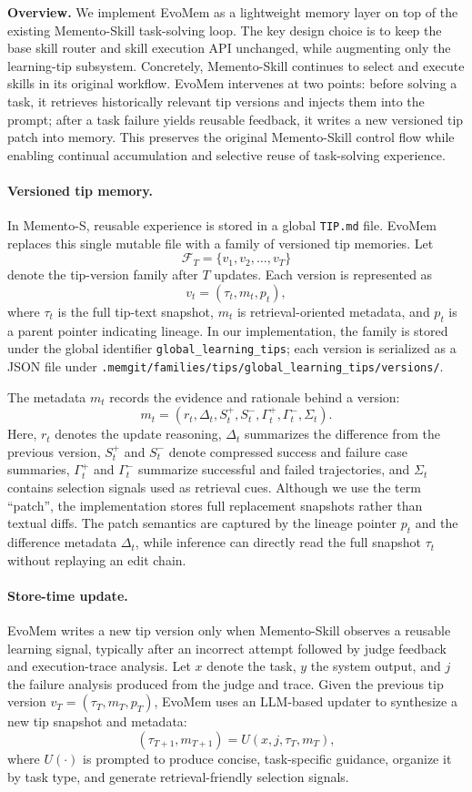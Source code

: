 \documentclass{article}
\begin{document}
\textbf{Overview.}
We implement EvoMem as a lightweight memory layer on top of the existing Memento-Skill task-solving loop. The key design choice is to keep the base skill router and skill execution API unchanged, while augmenting only the learning-tip subsystem. Concretely, Memento-Skill continues to select and execute skills in its original workflow. EvoMem intervenes at two points: before solving a task, it retrieves historically relevant tip versions and injects them into the prompt; after a task failure yields reusable feedback, it writes a new versioned tip patch into memory. This preserves the original Memento-Skill control flow while enabling continual accumulation and selective reuse of task-solving experience.

\paragraph{Versioned tip memory.}
In Memento-S, reusable experience is stored in a global \texttt{TIP.md} file. EvoMem replaces this single mutable file with a family of versioned tip memories. Let
\[
\mathcal{F}_T=\{v_1,v_2,\ldots,v_T\}
\]
denote the tip-version family after $T$ updates. Each version is represented as
\[
v_t=(\tau_t,m_t,p_t),
\]
where $\tau_t$ is the full tip-text snapshot, $m_t$ is retrieval-oriented metadata, and $p_t$ is a parent pointer indicating lineage. In our implementation, the family is stored under the global identifier \texttt{global\_learning\_tips}; each version is serialized as a JSON file under \texttt{.memgit/families/tips/global\_learning\_tips/versions/}.

The metadata $m_t$ records the evidence and rationale behind a version:
\[
m_t =
\left(
r_t,\Delta_t,S_t^{+},S_t^{-},\Gamma_t^{+},\Gamma_t^{-},\Sigma_t
\right).
\]
Here, $r_t$ denotes the update reasoning, $\Delta_t$ summarizes the difference from the previous version, $S_t^{+}$ and $S_t^{-}$ denote compressed success and failure case summaries, $\Gamma_t^{+}$ and $\Gamma_t^{-}$ summarize successful and failed trajectories, and $\Sigma_t$ contains selection signals used as retrieval cues. Although we use the term ``patch'', the implementation stores full replacement snapshots rather than textual diffs. The patch semantics are captured by the lineage pointer $p_t$ and the difference metadata $\Delta_t$, while inference can directly read the full snapshot $\tau_t$ without replaying an edit chain.

\paragraph{Store-time update.}
EvoMem writes a new tip version only when Memento-Skill observes a reusable learning signal, typically after an incorrect attempt followed by judge feedback and execution-trace analysis. Let $x$ denote the task, $y$ the system output, and $j$ the failure analysis produced from the judge and trace. Given the previous tip version $v_T=(\tau_T,m_T,p_T)$, EvoMem uses an LLM-based updater to synthesize a new tip snapshot and metadata:
\[
(\tau_{T+1},m_{T+1}) = U(x,j,\tau_T,m_T),
\]
where $U(\cdot)$ is prompted to produce concise, task-specific guidance, organize it by task type, and generate retrieval-friendly selection signals.
\end{document}
